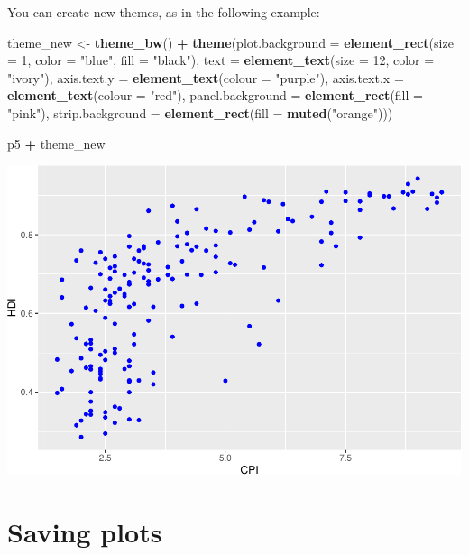 \documentclass[
]{book}
\newenvironment{Shaded}{\begin{snugshade}}{\end{snugshade}}
\newcommand{\DataTypeTok}[1]{\textcolor[rgb]{0.13,0.29,0.53}{#1}}
\newcommand{\DecValTok}[1]{\textcolor[rgb]{0.00,0.00,0.81}{#1}}
\newcommand{\KeywordTok}[1]{\textcolor[rgb]{0.13,0.29,0.53}{\textbf{#1}}}
\newcommand{\NormalTok}[1]{#1}
\newcommand{\OperatorTok}[1]{\textcolor[rgb]{0.81,0.36,0.00}{\textbf{#1}}}
\newcommand{\StringTok}[1]{\textcolor[rgb]{0.31,0.60,0.02}{#1}}
\begin{document}
You can create new themes, as in the following example:

\begin{Shaded}
\begin{Highlighting}[]
\NormalTok{theme\_new \textless{}{-}}\StringTok{ }\KeywordTok{theme\_bw}\NormalTok{() }\OperatorTok{+}
\StringTok{  }\KeywordTok{theme}\NormalTok{(}\DataTypeTok{plot.background =} \KeywordTok{element\_rect}\NormalTok{(}\DataTypeTok{size =} \DecValTok{1}\NormalTok{, }\DataTypeTok{color =} \StringTok{"blue"}\NormalTok{, }\DataTypeTok{fill =} \StringTok{"black"}\NormalTok{),}
        \DataTypeTok{text =} \KeywordTok{element\_text}\NormalTok{(}\DataTypeTok{size =} \DecValTok{12}\NormalTok{, }\DataTypeTok{color =} \StringTok{"ivory"}\NormalTok{),}
        \DataTypeTok{axis.text.y =} \KeywordTok{element\_text}\NormalTok{(}\DataTypeTok{colour =} \StringTok{"purple"}\NormalTok{),}
        \DataTypeTok{axis.text.x =} \KeywordTok{element\_text}\NormalTok{(}\DataTypeTok{colour =} \StringTok{"red"}\NormalTok{),}
        \DataTypeTok{panel.background =} \KeywordTok{element\_rect}\NormalTok{(}\DataTypeTok{fill =} \StringTok{"pink"}\NormalTok{),}
        \DataTypeTok{strip.background =} \KeywordTok{element\_rect}\NormalTok{(}\DataTypeTok{fill =} \KeywordTok{muted}\NormalTok{(}\StringTok{"orange"}\NormalTok{)))}

\NormalTok{p5 }\OperatorTok{+}\StringTok{ }\NormalTok{theme\_new}
\end{Highlighting}
\end{Shaded}

\includegraphics{R/Rgraphics/figures/unnamed-chunk-198-1.pdf}

\hypertarget{saving-plots}{%
\section{Saving plots}\label{saving-plots}}
\end{document}
